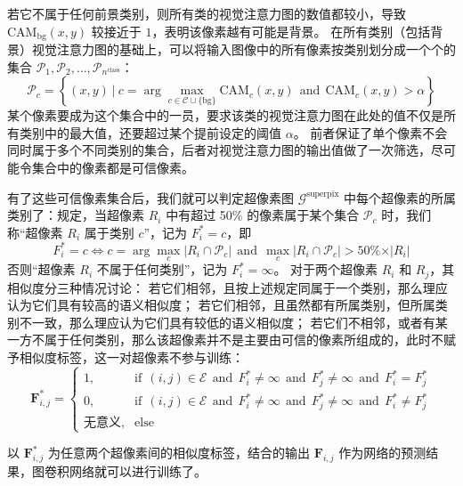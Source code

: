 若它不属于任何前景类别，则所有类的视觉注意力图的数值都较小，导致 $\text{CAM}_\text{bg}(x,y)$ 较接近于 $1$，表明该像素越有可能是背景。
在所有类别（包括背景）视觉注意力图的基础上，可以将输入图像中的所有像素按类别划分成一个个的集合 $\mathcal{P}_1, \mathcal{P}_2, \dots, \mathcal{P}_{n^\text{class}}$：
\begin{equation}
\mathcal{P}_c = \left\{ (x,y)\ \vert\ c = \arg\max_{ c \in \mathcal{C} \cup \{ \text{bg} \}} \text{CAM}_c(x,y)\ \ \text{and}\ \ \text{CAM}_c(x,y) > \alpha \right\}
\end{equation}
某个像素要成为这个集合中的一员，要求该类的视觉注意力图在此处的值不仅是所有类别中的最大值，还要超过某个提前设定的阈值 $\alpha$。
前者保证了单个像素不会同时属于多个不同类别的集合，后者对视觉注意力图的输出值做了一次筛选，尽可能令集合中的像素都是可信像素。
\par
有了这些可信像素集合后，我们就可以判定超像素图 $\mathcal{G}^\text{superpix}$ 中每个超像素的所属类别了：规定，当超像素 $R_i$ 中有超过 50\% 的像素属于某个集合 $\mathcal{P}_c$ 时，我们称“超像素 $R_i$ 属于类别 $c$”，记为 $F^{*}_i = c$，即
\begin{equation}
F^{*}_i = c
\iff
c = \arg\max\limits_c \vert R_i \cap \mathcal{P}_c \vert\ \ \text{and}\ \ \max\limits_c \vert R_i \cap \mathcal{P}_c \vert > 50\% \times \vert R_i \vert
\end{equation}
否则“超像素 $R_i$ 不属于任何类别”，记为 $F^{*}_i = \infty$。
对于两个超像素 $R_i$ 和 $R_j$，其相似度分三种情况讨论：
若它们相邻，且按上述规定同属于一个类别，那么理应认为它们具有较高的语义相似度；
若它们相邻，且虽然都有所属类别，但所属类别不一致，那么理应认为它们具有较低的语义相似度；
若它们不相邻，或者有某一方不属于任何类别，那么该超像素并不是主要由可信的像素所组成的，此时不赋予相似度标签，这一对超像素不参与训练：
\begin{equation}
\mathbf{F}^{*}_{i,j} =
\begin{cases}
1,&\text{if}\ \ (i,j) \in \mathcal{E}\ \ \text{and}\ \ F^{*}_i \neq \infty\ \ \text{and}\ \ F^{*}_j \neq \infty\ \ \text{and}\ \ F^{*}_i = F^{*}_j\\
0,&\text{if}\ \ (i,j) \in \mathcal{E}\ \ \text{and}\ \ F^{*}_i \neq \infty\ \ \text{and}\ \ F^{*}_j \neq \infty\ \ \text{and}\ \ F^{*}_i \neq F^{*}_j\\
\text{无意义},&\text{else}
\end{cases}
\end{equation}
\par
以 $\mathbf{F}^{*}_{i,j}$ 为任意两个超像素间的相似度标签，结合的输出 $\mathbf{F}_{i,j}$ 作为网络的预测结果，图卷积网络就可以进行训练了。
